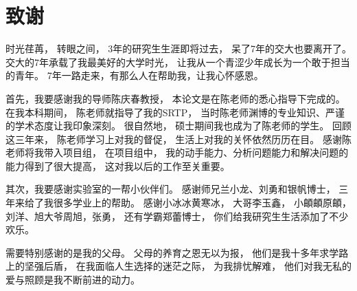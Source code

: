 \chapter*{致\qquad{}谢}
时光荏苒，
转眼之间，
3年的研究生生涯即将过去，
呆了7年的交大也要离开了。
交大的7年承载了我最美好的大学时光，
让我从一个青涩少年成长为一个敢于担当的青年。
7年一路走来，有那么人在帮助我，让我心怀感恩。
\par
首先，我要感谢我的导师陈庆春教授，
本论文是在陈老师的悉心指导下完成的。
在我本科期间，
陈老师就指导了我的SRTP，
当时陈老师渊博的专业知识、严谨的学术态度让我印象深刻。
很自然地，
硕士期间我也成为了陈老师的学生。
回顾这三年来，
陈老师学习上对我的督促，
生活上对我的关怀依然历历在目。
感谢陈老师将我带入项目组，
在项目组中，
我的动手能力、分析问题能力和解决问题的能力得到了很大提高，
这对我以后的工作至关重要。
\par
其次，我要感谢实验室的一帮小伙伴们。
感谢师兄兰小龙、刘勇和银帆博士，
三年来给了我很多学业上的帮助。
感谢小冰冰黄寒冰，
大哥李玉鑫，
小頔頔原頔，
刘洋、旭大爷周旭，张勇，
还有学霸郑蕾博士，
你们给我研究生生活添加了不少欢乐。
\par
需要特别感谢的是我的父母。
父母的养育之恩无以为报，
他们是我十多年求学路上的坚强后盾，
在我面临人生选择的迷茫之际，
为我排忧解难，
他们对我无私的爱与照顾是我不断前进的动力。